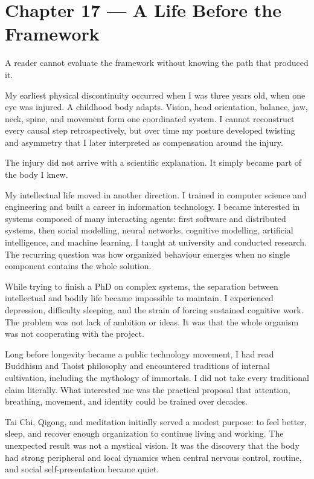 \chapter{Chapter 17 --- A Life Before the Framework}\label{chapter-17-a-life-before-the-framework}

A reader cannot evaluate the framework without knowing the path that produced it.

My earliest physical discontinuity occurred when I was three years old, when one eye was injured. A childhood body adapts. Vision, head orientation, balance, jaw, neck, spine, and movement form one coordinated system. I cannot reconstruct every causal step retrospectively, but over time my posture developed twisting and asymmetry that I later interpreted as compensation around the injury.

The injury did not arrive with a scientific explanation. It simply became part of the body I knew.

My intellectual life moved in another direction. I trained in computer science and engineering and built a career in information technology. I became interested in systems composed of many interacting agents: first software and distributed systems, then social modelling, neural networks, cognitive modelling, artificial intelligence, and machine learning. I taught at university and conducted research. The recurring question was how organized behaviour emerges when no single component contains the whole solution.

While trying to finish a PhD on complex systems, the separation between intellectual and bodily life became impossible to maintain. I experienced depression, difficulty sleeping, and the strain of forcing sustained cognitive work. The problem was not lack of ambition or ideas. It was that the whole organism was not cooperating with the project.

Long before longevity became a public technology movement, I had read Buddhism and Taoist philosophy and encountered traditions of internal cultivation, including the mythology of immortals. I did not take every traditional claim literally. What interested me was the practical proposal that attention, breathing, movement, and identity could be trained over decades.

Tai Chi, Qigong, and meditation initially served a modest purpose: to feel better, sleep, and recover enough organization to continue living and working. The unexpected result was not a mystical vision. It was the discovery that the body had strong peripheral and local dynamics when central nervous control, routine, and social self-presentation became quiet.

